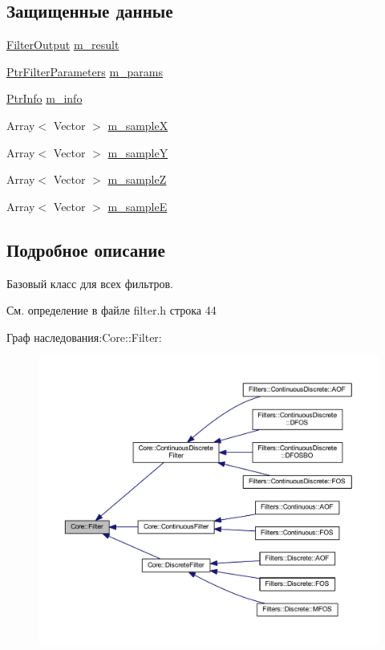 \subsection*{Защищенные данные}
\begin{DoxyCompactItemize}
\item 
\hyperlink{namespace_core_a60877581a235fc9566087b54d463ce9c}{Filter\+Output} \hyperlink{class_core_1_1_filter_a1ae638614492df7edeaa2db4f528ad65}{m\+\_\+result}
\item 
\hyperlink{namespace_core_a4811af8148ba137d644b9a61a042cf03}{Ptr\+Filter\+Parameters} \hyperlink{class_core_1_1_filter_ae4d42bb0f0e6299d4edbfc310e96d09f}{m\+\_\+params}
\item 
\hyperlink{namespace_core_a647483da8a1266d5bbd3e9bb5cd66d08}{Ptr\+Info} \hyperlink{class_core_1_1_filter_a089304c3d1695bd6b47d5bfd8fcfb574}{m\+\_\+info}
\item 
Array$<$ Vector $>$ \hyperlink{class_core_1_1_filter_abed73a8bfce99d24418f6dee90c44333}{m\+\_\+sampleX}
\item 
Array$<$ Vector $>$ \hyperlink{class_core_1_1_filter_a3e2e475b650504bb7c800e3f27364580}{m\+\_\+sampleY}
\item 
Array$<$ Vector $>$ \hyperlink{class_core_1_1_filter_af0e905e89bc5db8e07f283b68fb57a60}{m\+\_\+sampleZ}
\item 
Array$<$ Vector $>$ \hyperlink{class_core_1_1_filter_acab6dcadb8caf8f05cb2beeb1deafd74}{m\+\_\+sampleE}
\end{DoxyCompactItemize}


\subsection{Подробное описание}
Базовый класс для всех фильтров. 

См. определение в файле filter.\+h строка 44



Граф наследования\+:Core\+:\+:Filter\+:
\nopagebreak
\begin{figure}[H]
\begin{center}
\leavevmode
\includegraphics[width=350pt]{class_core_1_1_filter__inherit__graph}
\end{center}
\end{figure}


